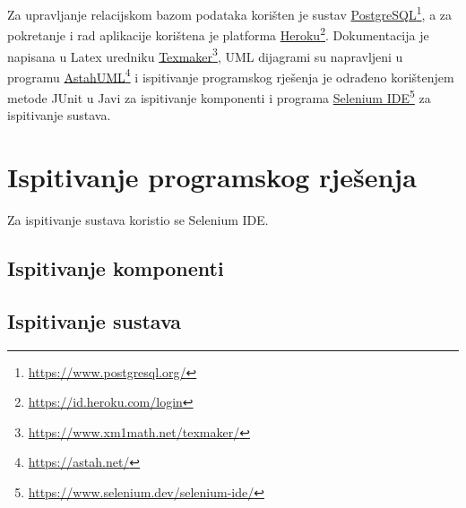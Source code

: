 			Za upravljanje relacijskom bazom podataka korišten je sustav \underline{PostgreSQL}\footnote{\url{https://www.postgresql.org/}}, a za pokretanje i rad aplikacije korištena je platforma \underline{Heroku}\footnote{\url{https://id.heroku.com/login}}. Dokumentacija je napisana u Latex uredniku \underline{Texmaker}\footnote{\url{https://www.xm1math.net/texmaker/}}, UML dijagrami su napravljeni u programu \underline{AstahUML}\footnote{\url{https://astah.net/}} i ispitivanje programskog rješenja je odrađeno korištenjem metode JUnit u Javi za ispitivanje komponenti i programa \underline{Selenium IDE}\footnote{\url{https://www.selenium.dev/selenium-ide/}} za ispitivanje sustava.

	
		\section{Ispitivanje programskog rješenja}
			
%			

		Za ispitivanje sustava koristio se Selenium IDE.
	
			
			\subsection{Ispitivanje komponenti}
			
			
			
			\subsection{Ispitivanje sustava}
			
